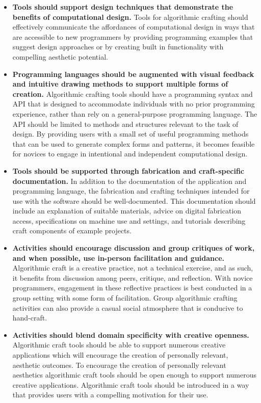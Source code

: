 \documentclass{sigchi}
\begin{document}
\begin{itemize}
\item \textbf{Tools should support design techniques that demonstrate the benefits of computational design.} Tools for algorithmic crafting should effectively communicate the affordances of computational design in ways that are accessible to new programmers by providing programming examples that suggest design approaches or by creating built in functionality with compelling aesthetic potential.

\item \textbf{Programming languages should be augmented with visual feedback and intuitive drawing methods to support multiple forms of creation.} Algorithmic crafting tools should have a programming syntax and API that is designed to accommodate individuals with no prior programming experience, rather than rely on a general-purpose programming language. The API should be limited to methods and structures relevant to the task of design. By providing users with a small set of useful programming methods that can be used to generate complex forms and patterns, it becomes feasible for novices to engage in intentional and independent computational design.

\item \textbf{Tools should be supported through fabrication and craft-specific documentation.} In addition to the documentation of the application and programming language, the fabrication and crafting techniques intended for use with the software should be well-documented. This documentation should include an explanation of suitable materials, advice on digital fabrication access, specifications on machine use and settings, and tutorials describing craft components of example projects.

\item \textbf{Activities should encourage discussion and group critiques of work, and when possible, use in-person facilitation and guidance.} Algorithmic craft is a creative practice, not a technical exercise, and as such, it benefits from discussion among peers, critique, and reflection. With novice programmers, engagement in these reflective practices is best conducted in a group setting with some form of facilitation. Group algorithmic crafting activities can also provide a casual social atmosphere that is conducive to hand-craft.

\item \textbf{Activities should blend domain specificity with creative openness.} Algorithmic craft tools should be able to support numerous creative applications which will encourage the creation of personally relevant, aesthetic outcomes. To encourage the creation of personally relevant aesthetics algorithmic craft tools should be open enough to support numerous creative applications. Algorithmic craft tools should be introduced in a way that provides users with a compelling motivation for their use.


\end{itemize}
\end{document}
